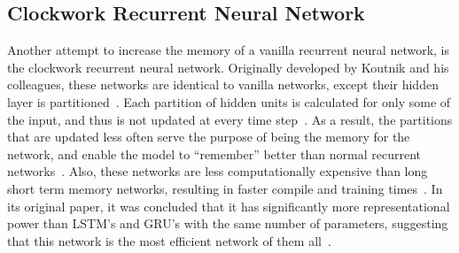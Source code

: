 \documentclass[12pt, titlepage]{article}
\begin{document}
\subsection{Clockwork Recurrent Neural Network}
Another attempt to increase the memory of a vanilla recurrent neural network, is
the clockwork recurrent neural network. Originally developed by Koutnik and his
colleagues, these networks are identical to vanilla networks, except their
hidden layer is partitioned~\cite{cw-rnn}. Each partition of hidden units is
calculated for only some of the input, and thus is not updated at every time
step~\cite{cw-rnn}. As a result, the partitions that are updated less often
serve the purpose of being the memory for the network, and enable the model to
``remember'' better than normal recurrent networks~\cite{cw-rnn}. Also, these
networks are less computationally expensive than long short term memory
networks, resulting in faster compile and training times~\cite{cw-rnn}. In its
original paper, it was concluded that it has significantly more representational
power than LSTM's and GRU's with the same number of parameters, suggesting that
this network is the most efficient network of them all~\cite{cw-rnn}.

\end{document}
